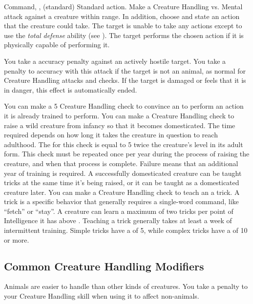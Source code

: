     \begin{sustainability}{Command}{, ,  (standard)}
      \abilityusagetime Standard action.
      \rankline
      Make a Creature Handling vs. Mental attack against a creature within \rngmed range.
      In addition, choose and state an action that the creature could take.
      \hit The target is unable to take any actions except to use the \textit{total defense} ability (see ).
      \crit The target performs the chosen action if it is physically capable of performing it.

      You take a  accuracy penalty against an actively hostile target.
      You take a  penalty to accuracy with this attack if the target is not an animal, as normal for Creature Handling attacks and checks.
      If the target is damaged or feels that it is in danger, this effect is automatically ended.
    \end{sustainability}
     You can make a  5 Creature Handling check to convince an  to perform an action it is already trained to perform.
     You can make a Creature Handling check to raise a wild creature from infancy so that it becomes domesticated.
    The time required depends on how long it takes the creature in question to reach adulthood.
    The  for this check is equal to 5 \add twice the creature's level in its adult form.
    This check must be repeated once per year during the process of raising the creature, and when that process is complete.
    Failure means that an additional year of training is required.
    A successfully domesticated creature can be taught tricks at the same time it's being raised, or it can be taught as a domesticated creature later.
     You can make a Creature Handling check to teach an  a trick.
    A trick is a specific behavior that generally requires a single-word command, like ``fetch'' or ``stay''.
    A creature can learn a maximum of two tricks per point of Intelligence it has above .
    Teaching a trick generally takes at least a week of intermittent training.
    Simple tricks have a  of 5, while complex tricks have a  of 10 or more.

  \subsection{Common Creature Handling Modifiers}
    Animals are easier to handle than other kinds of creatures.
    You take a  penalty to your Creature Handling skill when using it to affect non-animals.

